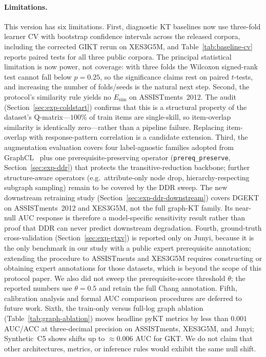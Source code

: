 \documentclass[pdflatex,sn-basic]{sn-jnl}
\newcommand{\Esim}{\ensuremath{E_{\text{sim}}}}
\newcommand{\DDR}{\textsc{DDR}}
\begin{document}
\paragraph{Limitations.}
This version has six limitations.
First, diagnostic KT baselines now use three-fold learner CV with bootstrap
confidence intervals across the released corpora, including the corrected GIKT rerun
on XES3G5M, and Table~\ref{tab:baseline-cv} reports paired tests for all three
public corpora. The principal statistical limitation is now power, not coverage:
with three folds the Wilcoxon signed-rank test cannot fall below $p{=}0.25$, so
the significance claims rest on paired $t$-tests, and increasing the number of
folds/seeds is the natural next step.
Second, the protocol's similarity rule yields no $\Esim$ on
ASSISTments~2012. The audit
(Section~\ref{sec:exp-coldstart}) confirms that this is a structural
property of the dataset's Q-matrix---$100\%$ of train items are
single-skill, so item-overlap similarity is identically zero---rather
than a pipeline failure. Replacing item-overlap with response-pattern
correlation is a candidate extension.
Third, the augmentation evaluation covers four label-agnostic
families adopted from GraphCL~\cite{you2020graphcl} plus one
prerequisite-preserving operator (\texttt{prereq\_preserve},
Section~\ref{sec:exp-ddr}) that protects the transitive-reduction
backbone; further structure-aware operators (e.g.\ attribute-only
node drop, hierarchy-respecting subgraph sampling) remain to be
covered by the \DDR{} sweep. The new downstream retraining study
(Section~\ref{sec:exp-ddr-downstream}) covers DGEKT on ASSISTments~2012
and XES3G5M, not the full graph-KT family. Its near-null AUC response is
therefore a model-specific sensitivity result rather than proof that
\DDR{} can never predict downstream degradation.
Fourth, ground-truth cross-validation
(Section~\ref{sec:exp-gtxv}) is reported only on Junyi, because it is
the only benchmark in our study with a public expert prerequisite
annotation; extending the procedure to ASSISTments and XES3G5M
requires constructing or obtaining expert annotations for those
datasets, which is beyond the scope of this protocol paper. We also
did not sweep the prerequisite-score threshold $\theta$; the reported
numbers use $\theta=0.5$ and retain the full Chang annotation.
Fifth, calibration analysis and formal AUC comparison procedures are
deferred to future work.
Sixth, the train-only versus full-log graph ablation
(Table~\ref{tab:graph-ablation}) moves headline pyKT metrics by less than
$0.001$ AUC/ACC at three-decimal precision on ASSISTments, XES3G5M, and
Junyi; Synthetic~C5 shows shifts up to $\approx 0.006$ AUC for GKT. We do not
claim that other architectures, metrics, or inference rules would exhibit the
same null shift.
\end{document}
